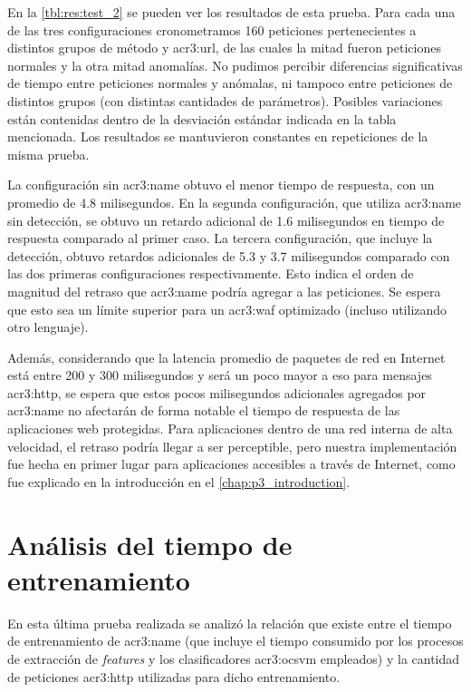 En la \autoref{tbl:res:test_2} se pueden ver los resultados de esta
prueba. Para cada una de las tres configuraciones cronometramos 160
peticiones pertenecientes a distintos grupos de método y \gls{acr3:url},
de las cuales la mitad fueron peticiones normales y la otra mitad anomalías.
No pudimos percibir diferencias significativas de tiempo entre peticiones
normales y anómalas, ni tampoco entre peticiones de distintos grupos
(con distintas cantidades de parámetros). Posibles variaciones están
contenidas dentro de la desviación estándar indicada en la tabla mencionada.
Los resultados se mantuvieron constantes en repeticiones de la misma prueba.

La configuración sin \gls{acr3:name} obtuvo el menor tiempo de respuesta,
con un promedio de \num{4.8} milisegundos.
En la segunda configuración, que utiliza \gls{acr3:name} sin detección,
se obtuvo un retardo adicional de \num{1.6} milisegundos en tiempo de
respuesta comparado al primer caso. La tercera configuración, que incluye
la detección, obtuvo retardos adicionales de \num{5.3} y \num{3.7}
milisegundos comparado con las dos primeras configuraciones respectivamente.
Esto indica el orden de magnitud del retraso que \gls{acr3:name} podría
agregar a las peticiones. Se espera que esto sea un límite superior
para un \gls{acr3:waf} optimizado (incluso utilizando otro lenguaje).

Además, considerando que la latencia promedio de paquetes de red en
Internet está entre 200 y 300 milisegundos \citep{internetWeatherMap}
y será un poco mayor a eso para mensajes \gls{acr3:http}, se espera que
estos pocos milisegundos adicionales agregados por \gls{acr3:name} no
afectarán de forma notable el tiempo de respuesta de las aplicaciones
web protegidas.
Para aplicaciones dentro de una red interna de alta velocidad, el retraso
podría llegar a ser perceptible, pero nuestra implementación fue hecha
en primer lugar para aplicaciones accesibles a través de Internet, como
fue explicado en la introducción en el \autoref{chap:p3_introduction}.


\section{Análisis del tiempo de entrenamiento}

En esta última prueba realizada se analizó la relación que existe entre
el tiempo de entrenamiento de \gls{acr3:name} (que incluye el tiempo
consumido por los procesos de extracción de \textit{features} y los
clasificadores \gls{acr3:ocsvm} empleados) y la cantidad de peticiones
\gls{acr3:http} utilizadas para dicho entrenamiento.

